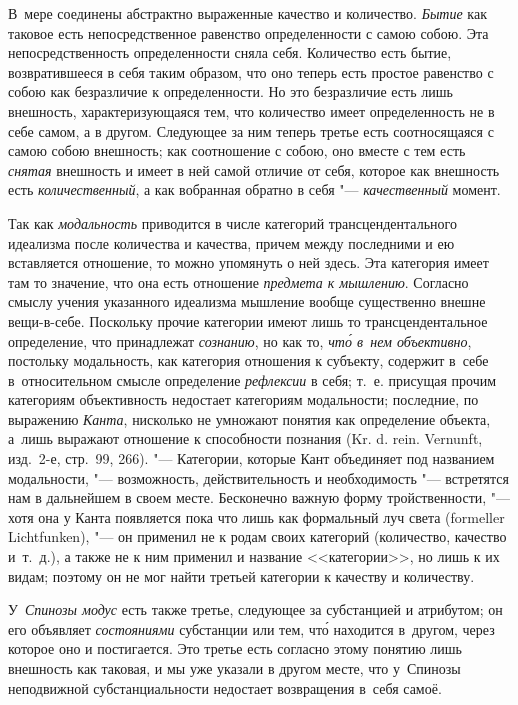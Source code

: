 В~мере соединены абстрактно выраженные качество и количество. {\em Бытие} как
таковое есть непосредственное равенство определенности с самою собою. Эта
непосредственность определенности сняла себя. Количество есть бытие,
возвратившееся в себя таким образом, что оно теперь есть простое равенство
с собою как безразличие к определенности. Но это безразличие есть лишь
внешность, характеризующаяся тем, что количество имеет определенность не в себе
самом, а в другом. Следующее за ним теперь третье есть соотносящаяся с самою
собою внешность; как соотношение с собою, оно вместе с тем есть {\em снятая}
внешность и имеет в ней самой отличие от себя, которое как внешность есть
{\em количественный}, а как вобранная обратно в себя "--- {\em качественный}
момент.

Так как {\em модальность} приводится в числе категорий трансцендентального
идеализма после количества и качества, причем между последними и ею вставляется
отношение, то можно упомянуть о ней здесь. Эта категория имеет там то значение,
что она есть отношение {\em предмета к мышлению}. Согласно смыслу учения
указанного идеализма мышление вообще существенно внешне вещи-в-себе. Поскольку
прочие категории имеют лишь то трансцендентальное определение, что принадлежат
{\em сознанию}, но как то, {\em чт\'{о} в~нем объективно}, постольку
модальность, как категория отношения к субъекту, содержит в~себе
в~относительном смысле определение {\em рефлексии} в себя; т.~е. присущая
прочим категориям объективность недостает категориям модальности; последние, по
выражению {\em Канта}, нисколько не умножают понятия как определение объекта,
а~лишь выражают отношение к способности познания (Kr. d. rein. Vernunft,
изд.~2-е, стр.~99, 266). "--- Категории, которые Кант объединяет под названием
модальности, "--- возможность, действительность и необходимость "--- встретятся
нам в дальнейшем в своем месте. Бесконечно важную форму тройственности, "---
хотя она у Канта появляется пока что лишь как формальный луч света (formeller
Lichtfunken), "--- он применил не к родам своих категорий (количество, качество
и~т.~д.), а также не к ним применил и название <<категории>>, но лишь к их
видам; поэтому он не мог найти третьей категории к качеству и количеству.

У~{\em Спинозы модус} есть также третье, следующее за субстанцией и атрибутом;
он его объявляет {\em состояниями} субстанции или тем, чт\'{о} находится
в~другом, через которое оно и постигается. Это третье есть согласно этому
понятию лишь внешность как таковая, и мы уже указали в другом месте, что
у~Спинозы неподвижной субстанциальности недостает возвращения в~себя самоё.

